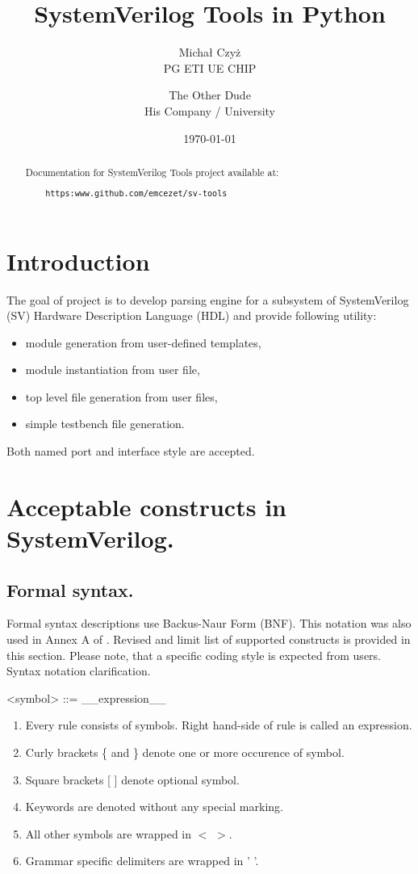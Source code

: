 \documentclass{article}
\title{SystemVerilog Tools in Python}
\author{Michał Czyż  \\
    PG ETI UE CHIP \\
    \and 
    The Other Dude \\
    His Company / University \\
    }
\date{\today}
\begin{document}
\maketitle
\tableofcontents
\newpage

\begin{abstract}
Documentation for SystemVerilog Tools project available at:
\begin{verbatim}
    https:www.github.com/emcezet/sv-tools
\end{verbatim}

\end{abstract}

\section{Introduction}
{ The goal of project is to develop parsing engine for a subsystem of SystemVerilog (SV)
Hardware Description Language (HDL) and provide following utility:
\begin{itemize}
    \item module generation from user-defined templates,
    \item module instantiation from user file,
    \item top level file generation from user files,
    \item simple testbench file generation.
\end{itemize}
Both named port and interface style are accepted. }

\section{Acceptable constructs in SystemVerilog.}

\subsection{Formal syntax.}
{ Formal syntax descriptions use Backus-Naur Form (BNF). This notation was also used in Annex A of \cite{standard}.
Revised and limit list of supported constructs is provided in this section. Please note, that a specific coding
style is expected from users. Syntax notation clarification.}

\begin{grammar}
    <symbol> ::= __expression__
\end{grammar}

\begin{enumerate}
    \item Every rule consists of symbols. Right hand-side of rule is called an expression.
    \item Curly brackets \{ and \} denote one or more occurence of symbol.
    \item Square brackets [ ] denote optional symbol.
    \item Keywords are denoted without any special marking.
    \item All other symbols are wrapped in $<$ $>$.
    \item Grammar specific delimiters are wrapped in ' '.
\end{enumerate}
\end{document}
